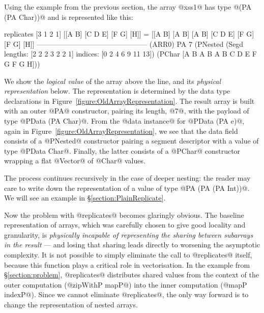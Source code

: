 Using the example from the previous section, the array @xss1@ has type @(PA (PA Char))@ and is represented like this:
%
\begin{small}
\begin{code}
   replicates [3 1 2 1] [[A B] [C D E] [F G] [H]]
   = [[A B] [A B] [A B] [C D E] [F G] [F G] [H]] 
 ----------------------------------------------- (ARR0)
  PA 7 (PNested
   (Segd lengths: [2 2 2 3 2 2  1] 
         indices: [0 2 4 6 9 11 13])
   (PChar [A B A B A B C D E F G F G H]))
\end{code}
\end{small}
%
We show the \emph{logical value} of the array above the line, and its \emph{physical representation} below. The representation is determined by the data type declarations in Figure~\ref{figure:OldArrayRepresentation}.  The result array is built with an outer @PA@ constructor, pairing its length, @7@, with the payload of type @PData (PA Char)@.  From the @data instance@ for @PData (PA e)@, again in Figure~\ref{figure:OldArrayRepresentation}, we see that the data field consists of a @PNested@ constructor pairing a segment descriptor with a value of type @PData Char@.  Finally, the latter consists of a @PChar@ constructor wrapping a flat @Vector@ of @Char@ values.

The process continues recursively in the case of deeper nesting: the reader may care to write down the representation of a value of type @PA (PA (PA Int))@. We will see an example in \S\ref{section:PlainReplicate}.

Now the problem with @replicates@ becomes glaringly obvious. The baseline representation of arrays, which was carefully chosen to give good locality and granularity, is \emph{physically incapable of representing the sharing between subarrays in the result} --- and losing that sharing leads directly to worsening the asymptotic complexity. It is not possible to simply eliminate the call to @replicates@ itself, because this function plays a critical role in vectorisation. In the example from \S\ref{section:problem}, @replicates@ distributes shared values from the context of the outer computation (@zipWithP mapP@) into the inner computation (@mapP indexP@). Since we cannot eliminate @replicates@, the only way forward is to change the representation of nested arrays.



